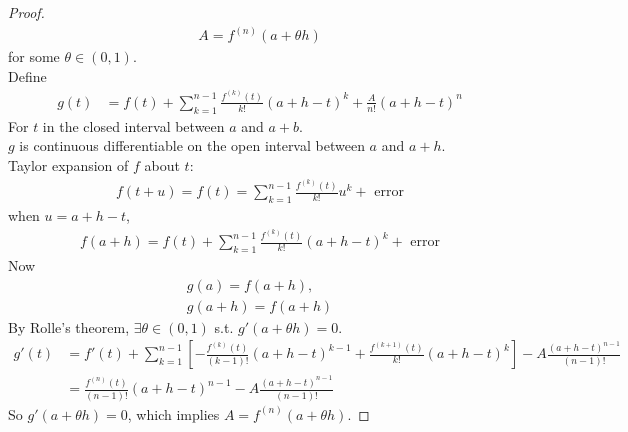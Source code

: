 \documentclass[a4paper]{article}
\begin{document}
\begin{thm}
\begin{proof}
\begin{equation*}
\begin{aligned}
A=f^{\left(n\right)} \left(a+\theta h\right)
\end{aligned}
\end{equation*}
for some $\theta \in \left(0,1\right)$.\\
Define
\begin{equation*}
\begin{aligned}
g\left(t\right)&=f\left(t\right)+\sum_{k=1}^{n-1}\frac{f^{\left(k\right)}\left(t\right)}{k!}\left(a+h-t\right)^k + \frac{A}{n!}\left(a+h-t\right)^n
\end{aligned}
\end{equation*}
For $t$ in the closed interval between $a$ and $a+b$.\\
$g$ is continuous differentiable on the open interval between $a$ and $a+h$.\\
Taylor expansion of $f$ about $t$:
\begin{equation*}
\begin{aligned}
f\left(t+u\right)=f\left(t\right) = \sum_{k=1}^{n-1} \frac{f^{\left(k\right)} \left(t\right)}{k!} u^k + \text{  error}
\end{aligned}
\end{equation*}
when $u=a+h-t$,
\begin{equation*}
\begin{aligned}
f\left(a+h\right)=f\left(t\right) + \sum_{k=1}^{n-1} \frac{f^{\left(k\right)} \left(t\right)}{k!}\left(a+h-t\right)^k + \text{  error}
\end{aligned}
\end{equation*}
Now
\begin{equation*}
\begin{aligned}
g\left(a\right)=f\left(a+h\right),\\
g\left(a+h\right)=f\left(a+h\right)
\end{aligned}
\end{equation*}
By Rolle's theorem, $\exists \theta \in \left(0,1\right)$ s.t. $g'\left(a+\theta h\right)=0$.
\begin{equation*}
\begin{aligned}
g'\left(t\right) &= f'\left(t\right) + \sum_{k=1}^{n-1} \left[-\frac{f^{\left(k\right)} \left(t\right)}{\left(k-1\right)!}\left(a+h-t\right)^{k-1} + \frac{f^{\left(k+1\right)}\left(t\right)}{k!}\left(a+h-t\right)^k\right] - A\frac{\left(a+h-t\right)^{n-1}}{\left(n-1\right)!}\\
&= \frac{f^{\left(n\right)} \left(t\right)}{\left(n-1\right)!}\left(a+h-t\right)^{n-1} - A \frac{\left(a+h-t\right)^{n-1}}{\left(n-1\right)!}
\end{aligned}
\end{equation*}
So $g'\left(a+\theta h\right) = 0$, which implies $A=f^{\left(n\right)} \left(a+\theta h\right)$.
\end{proof}
\end{thm}
\end{document}
